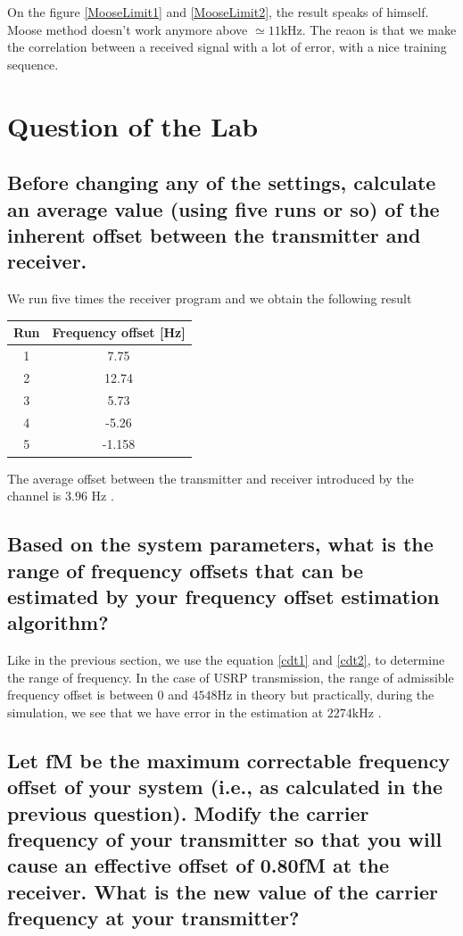 \documentclass[frenchb, oneside, headings=normal]{scrartcl}
\begin{document}
On the figure \ref{MooseLimit1} and \ref{MooseLimit2}, the result speaks of himself. Moose method doesn't work anymore above $\simeq 11 \si{\kilo\hertz}$. The reaon is that we make the correlation between a received signal with a lot of error, with a nice training sequence.

\section{Question of the Lab}

\subsection{Before changing any of the settings, calculate an average value (using five runs or so) of the inherent offset between the transmitter and receiver.}

We run five times the receiver program and we obtain the following result
 
\begin{center}
	\begin{tabular}{c|c}
		Run & Frequency offset [\si{\hertz}]\\
		\hline
		1 & 7.75\\
		2 & 12.74\\
		3 & 5.73\\
		4 & -5.26\\
		5 & -1.158\\
	\end{tabular}
\end{center}

The average offset between the transmitter and receiver introduced by the channel is $3.96$ \si{\hertz} .


\subsection{Based on the system parameters, what is the range of frequency offsets that can be estimated by your frequency offset estimation algorithm?}

Like in the previous section, we use the equation \ref{cdt1} and \ref{cdt2}, to determine the range of frequency. In the case of USRP transmission, the range of admissible frequency offset is between $0$ and $4548 \si{\hertz}$ in theory but practically, during the simulation, we see that we have error in the estimation at $2274 \si{\kilo\hertz}$ .

\subsection{Let fM be the maximum correctable frequency offset of your system (i.e., as calculated in the previous question). Modify the carrier frequency of your transmitter so that you will cause an effective offset of 0.80fM at the receiver. What is the new value of the carrier frequency at your transmitter?}
\end{document}
